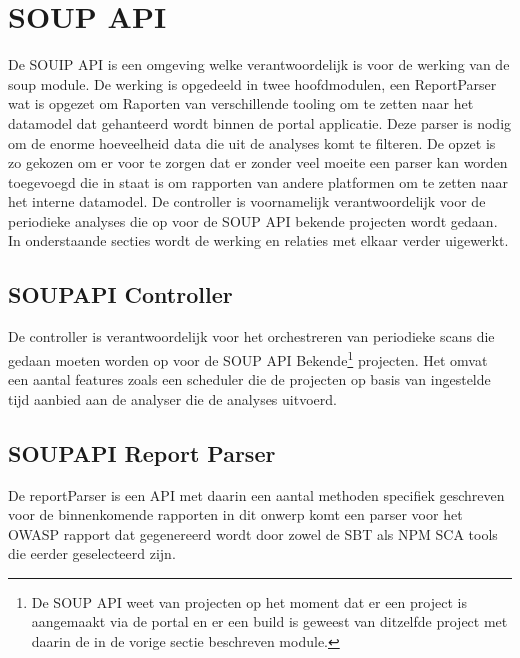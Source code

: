 \section{SOUP API}

De SOUIP API is een omgeving welke verantwoordelijk is voor de werking van de soup module. De werking is opgedeeld in twee hoofdmodulen, een ReportParser wat is opgezet om Raporten van verschillende tooling om te zetten naar het datamodel dat gehanteerd wordt binnen de portal applicatie. Deze parser is nodig om de enorme hoeveelheid data die uit de analyses komt te filteren. De opzet is zo gekozen om er voor te zorgen dat er zonder veel moeite een parser kan worden toegevoegd die in staat is om rapporten van andere platformen om te zetten naar het interne datamodel. De controller is voornamelijk verantwoordelijk voor de periodieke analyses die op voor de SOUP API bekende projecten wordt gedaan. In onderstaande secties wordt de werking en relaties met elkaar verder uigewerkt.

\subsection{SOUPAPI Controller}
De controller is verantwoordelijk voor het orchestreren van periodieke scans die gedaan moeten worden op voor de SOUP API Bekende\footnote{De SOUP API weet van projecten op het moment dat er een project is aangemaakt via de portal en er een build is geweest van ditzelfde project met daarin de in de vorige sectie beschreven module.} projecten. Het omvat een aantal features zoals een scheduler die de projecten op basis van ingestelde tijd aanbied aan de analyser die de analyses uitvoerd.

\subsection{SOUPAPI Report Parser}
De reportParser is een API met daarin een aantal methoden specifiek geschreven voor de binnenkomende rapporten in dit onwerp komt een parser voor het OWASP rapport dat gegenereerd wordt door zowel de SBT als NPM SCA tools die eerder geselecteerd zijn.
